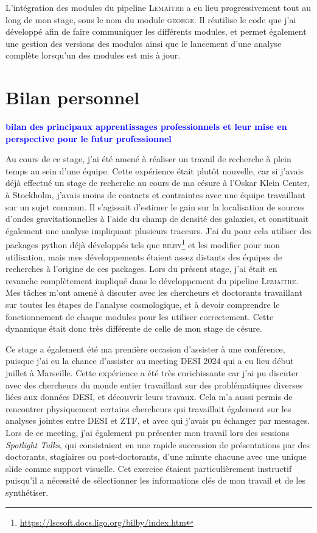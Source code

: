 \documentclass{book}
\newcommand{\consignes}[1]{{\textcolor{blue}{\bf \large #1}}}
\def\lemaitre{\textsc{Lemaître}\xspace}
\begin{document}
L'intégration des modules du pipeline \lemaitre a eu lieu progressivement tout au long de mon stage, sous le nom du module \textsc{george}. Il réutilise le code que j'ai développé afin de faire communiquer les différents modules, et permet également une gestion des versions des modules ainsi que le lancement d'une analyse complète lorsqu'un des modules est mis à jour.


\chapter{Bilan personnel}
\consignes{bilan des principaux apprentissages professionnels et leur mise en perspective pour le futur professionnel}

Au cours de ce stage, j'ai été amené à réaliser un travail de recherche à plein temps au sein d'une équipe. Cette expérience était plutôt nouvelle, car si j'avais déjà effectué un stage de recherche au cours de ma césure à l'Oskar Klein Center, à Stockholm, j'avais moins de contacts et contraintes avec une équipe travaillant sur un sujet commun. Il s'agissait d'estimer le gain sur la localisation de sources d'ondes gravitationnelles à l'aide du champ de densité des galaxies, et constituait également une analyse impliquant plusieurs traceurs. J'ai du pour cela utiliser des packages python déjà développés tels que \textsc{bilby}\footnote{\href{https://lscsoft.docs.ligo.org/bilby/index.html}{https://lscsoft.docs.ligo.org/bilby/index.htm}} et les modifier pour mon utilisation, mais mes développements étaient assez distants des équipes de recherches à l'origine de ces packages. Lors du présent stage, j'ai était en revanche complètement impliqué dans le développement du pipeline \lemaitre. Mes tâches m'ont amené à discuter avec les chercheurs et doctorants travaillant sur toutes les étapes de l'analyse cosmologique, et à devoir comprendre le fonctionnement de chaque modules pour les utiliser correctement. Cette dynamique était donc très différente de celle de mon stage de césure.

Ce stage a également été ma première occasion d'assister à une conférence, puisque j'ai eu la chance d'assister au meeting DESI 2024 qui a eu lieu début juillet à Marseille. Cette expérience a été très enrichissante car j'ai pu discuter avec des chercheurs du monde entier travaillant sur des problématiques diverses liées aux données DESI, et découvrir leurs travaux. Cela m'a aussi permis de rencontrer physiquement certains chercheurs qui travaillait également sur les analyses jointes entre DESI et ZTF, et avec qui j'avais pu échanger par messages. Lors de ce meeting, j'ai également pu présenter mon travail lors des sessions \textit{Spotlight Talks}, qui consistaient en une rapide succession de présentations par des doctorants, stagiaires ou post-doctorants, d'une minute chacune avec une unique slide comme support visuelle. Cet exercice étaient particulièrement instructif puisqu'il a nécessité de sélectionner les informations clés de mon travail et de les synthétiser.
\end{document}
